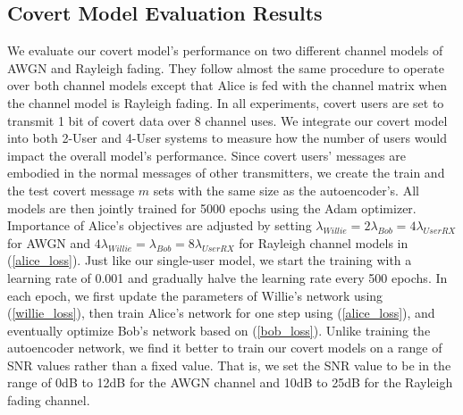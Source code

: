 \subsection{Covert Model Evaluation Results}
We evaluate our covert model's performance on two different channel models of AWGN and Rayleigh fading. They follow almost the same procedure to operate over both channel models except that Alice is fed with the channel matrix when the channel model is Rayleigh fading. In all experiments, covert users are set to transmit 1 bit of covert data over 8 channel uses. We integrate our covert model into both 2-User and 4-User systems to measure how the number of users would impact the overall model's performance. Since covert users' messages are embodied in the normal messages of other transmitters, we create the train and the test covert message \(m\) sets with the same size as the autoencoder's. All models are then jointly trained for 5000 epochs using the Adam optimizer. Importance of Alice's objectives are adjusted by setting \(\lambda_{Willie} = 2 \lambda_{Bob} = 4 \lambda_{UserRX}\) for AWGN and  \(4 \lambda_{Willie} = \lambda_{Bob} = 8 \lambda_{UserRX}\) for Rayleigh channel models in (\ref{alice_loss}). Just like our single-user model, we start the training with a learning rate of 0.001 and gradually halve the learning rate every 500 epochs. In each epoch, we first update the parameters of Willie's network using (\ref{willie_loss}), then train Alice's network for one step using (\ref{alice_loss}), and eventually optimize Bob's network based on (\ref{bob_loss}). Unlike training the autoencoder network, we find it better to train our covert models on a range of SNR values rather than a fixed value. That is, we set the SNR value to be in the range of 0dB to 12dB for the AWGN channel and 10dB to 25dB for the Rayleigh fading channel.



